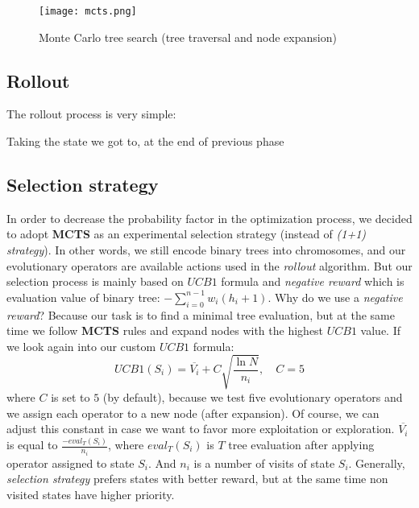\documentclass[12pt]{article}
\newcommand{\sumin}[2]{\sum\limits_{#1}^{#2}}
\begin{document}
\begin{figure}
\centering
\texttt{[image: mcts.png]}
\caption{Monte Carlo tree search (tree traversal and node expansion)}
\label{fig:mcts}
\end{figure}

\clearpage 

\subsection{Rollout}
The rollout process is very simple:

\begin{algorithm}
\scriptsize
\caption{Taking the state we got to, at the end of previous phase}
\begin{algorithmic}[]

    \LOOP
    \ENDLOOP
\end{algorithmic}
\end{algorithm}

\subsection{Selection strategy}
In order to decrease the probability factor in the optimization process, we decided to adopt \textbf{MCTS} as an experimental selection strategy (instead of \textit{(1+1) strategy}).
In other words, we still encode binary trees into chromosomes, and our evolutionary operators are available actions used in the \textit{rollout} algorithm.
But our selection process is mainly based on $UCB1$ formula and \textit{negative reward} which is evaluation value of binary tree: $-\sumin{i=0}{n-1} w_i (h_i + 1)$.
Why do we use a \textit{negative reward}? Because our task is to find a minimal tree evaluation, but at the same time we follow \textbf{MCTS} rules and expand nodes with the highest $UCB1$ value.
If we look again into our custom $UCB1$ formula:
\[
    UCB1(S_i) = \overline{V_i} + C \sqrt{\frac{\ln{N}}{n_i}},\quad C=5
\]
where $C$ is set to $5$ (by default), because we test five evolutionary operators and we assign each operator to a new node (after expansion). Of course, we can adjust this constant in case we want to favor more exploitation or exploration.
$\overline{V_i}$ is equal to $\frac{-eval_{T}(S_i)}{n_i}$, where $eval_{T}(S_i)$ is $T$ tree evaluation after applying operator assigned to state $S_i$. And $n_i$ is a number of visits of state $S_i$.
Generally, \textit{selection strategy} prefers states with better reward, but at the same time non visited states have higher priority.
\end{document}
